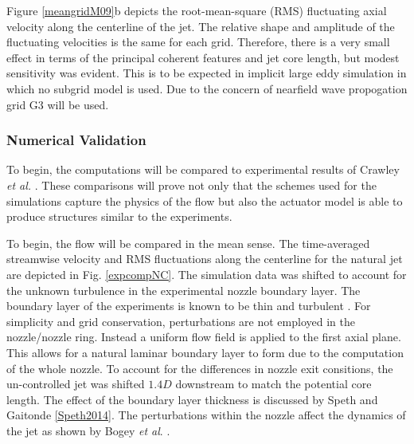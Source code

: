 \documentclass[english]{aiaa-tc}
\begin{document}
Figure \ref{meangridM09}b depicts the root-mean-square (RMS) fluctuating axial velocity along the centerline of the jet. The relative shape and amplitude of the fluctuating velocities is the same for each grid. Therefore, there is a very small
effect in terms of the principal coherent features and jet core
length, but modest sensitivity was evident. This is to be expected in implicit large eddy simulation in which no subgrid model is used. Due to the concern of nearfield wave propogation grid G3 will be used.


\subsubsection{Numerical Validation}
To begin, the computations will be compared to experimental results of Crawley {\em et al.} \cite{Crawley2014}. These comparisons will prove not only that the schemes used for the simulations capture the physics of the flow but also the actuator model is able to produce structures similar to the experiments.

To begin, the flow will be compared in the mean sense. The time-averaged streamwise velocity and RMS fluctuations along the centerline for the natural jet are depicted in Fig. \ref{expcompNC}. The simulation data was shifted to account for the unknown turbulence in the experimental nozzle boundary layer.
The boundary layer of the experiments is known to be thin and turbulent \cite{kastnerj2009-1}.
For simplicity and grid conservation, perturbations are not employed in the nozzle/nozzle ring. Instead a uniform flow field is applied to the first axial plane. This allows for a natural laminar boundary layer to form due to the computation of the whole nozzle. To account for the differences in nozzle exit consitions, the  un-controlled jet was shifted $1.4D$ downstream to match the potential core length. The effect of the boundary layer thickness is discussed by Speth and Gaitonde \ref{Speth2014}. The perturbations within the nozzle affect the dynamics of the jet as shown by Bogey {\em et al}. \cite{bogey2012}.
 
\end{document}
